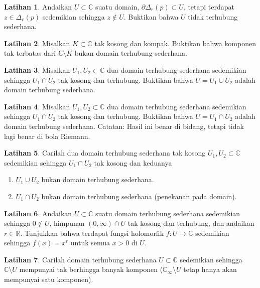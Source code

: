 \documentclass[12pt,openany]{book}
\newcommand{\C}{{\mathbb{C}}}
\newcommand{\R}{{\mathbb{R}}}
\theoremstyle{plain}
\theoremstyle{remark}
\theoremstyle{definition}
\newenvironment{exbox}{%
    \def\FrameCommand{\vrule width 1pt \relax\hspace{10pt}}%
    \MakeFramed{\advance\hsize-\width\FrameRestore}%
}{%
    \endMakeFramed
}
\newenvironment{exnumparts}{%
    \leavevmode\begin{enumerate}[1),noitemsep,topsep=0pt,parsep=0pt,partopsep=0pt]
}{%
    \end{enumerate}
}
\theoremstyle{exercise}
\newtheorem{exercise}{Latihan}[section]
\theoremstyle{example}
\begin{document}
\begin{exbox}
\begin{exercise}
Andaikan $U \subset \C$ suatu domain, $\partial \Delta_r(p) \subset U$,
tetapi terdapat $z \in \Delta_r(p)$ sedemikian sehingga $z \notin U$.
Buktikan bahwa $U$ tidak terhubung sederhana.
\end{exercise}

\begin{exercise}
Misalkan $K \subset \C$ tak kosong dan kompak.
Buktikan bahwa komponen tak terbatas dari $\C \setminus K$ bukan
domain terhubung sederhana.
\end{exercise}

\begin{exercise}
Misalkan $U_1,U_2 \subset \C$ dua domain terhubung sederhana sedemikian sehingga $U_1 \cap
U_2$ tak kosong dan terhubung.
Buktikan bahwa $U = U_1 \cup U_2$ adalah domain terhubung sederhana.
\end{exercise}

\begin{exercise}
Misalkan $U_1,U_2 \subset \C$ dua domain terhubung sederhana sedemikian sehingga $U_1 \cap
U_2$ tak kosong dan terhubung.
Buktikan bahwa $U = U_1 \cap U_2$ adalah domain terhubung sederhana.
Catatan: Hasil ini benar di bidang, tetapi tidak lagi benar di bola Riemann.
\end{exercise}

\begin{exercise}
Carilah dua domain terhubung sederhana tak kosong
$U_1,U_2 \subset \C$ sedemikian sehingga $U_1 \cap U_2$ tak kosong dan keduanya
\begin{exnumparts}
\item
$U_1 \cup U_2$ bukan domain terhubung sederhana.
\item
$U_1 \cap U_2$ bukan domain terhubung sederhana (penekanan pada domain).
\end{exnumparts}
\end{exercise}

\begin{exercise}
Andaikan $U \subset \C$ suatu domain terhubung sederhana sedemikian sehingga $0 \notin U$,
himpunan $(0,\infty) \cap U$ tak kosong dan terhubung, dan andaikan $r \in \R$.
Tunjukkan bahwa terdapat fungsi holomorfik $f \colon U \to \C$
sedemikian sehingga $f(x) = x^r$ untuk semua $x > 0$ di $U$.
\end{exercise}

\begin{exercise}
Carilah domain terhubung sederhana $U \subset \C$ sedemikian sehingga $\C \setminus U$
mempunyai tak berhingga banyak komponen ($\C_\infty \setminus U$ tetap hanya akan
mempunyai satu komponen).
\end{exercise}
\end{exbox}
\end{document}
